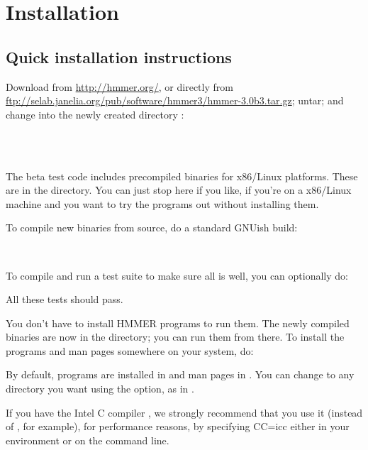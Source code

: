\section{Installation}
\label{section:installation}
\setcounter{footnote}{0}

\subsection{Quick installation instructions}

Download  from
\url{http://hmmer.org/}, or directly from
\url{ftp://selab.janelia.org/pub/software/hmmer3/hmmer-3.0b3.tar.gz};
untar; and change into the newly created directory :

\\
\\

The beta test code includes precompiled binaries for x86/Linux
platforms. These are in the  directory. You can just
stop here if you like, if you're on a x86/Linux machine and you want
to try the programs out without installing them.

To compile new binaries from source, do a standard GNUish build:

\\ 

To compile and run a test suite to make sure all is well, you can
optionally do:


All these tests should pass.

You don't have to install HMMER programs to run them. The newly
compiled binaries are now in the  directory; you can run
them from there. To install the programs and man pages somewhere on
your system, do:


By default, programs are installed in  and man
pages in . You can change 
to any directory you want using the 
option, as in .

If you have the Intel C compiler , we strongly recommend
that you use it (instead of , for example), for performance
reasons, by specifying {CC=icc} either in your environment or on the
 command line. 

